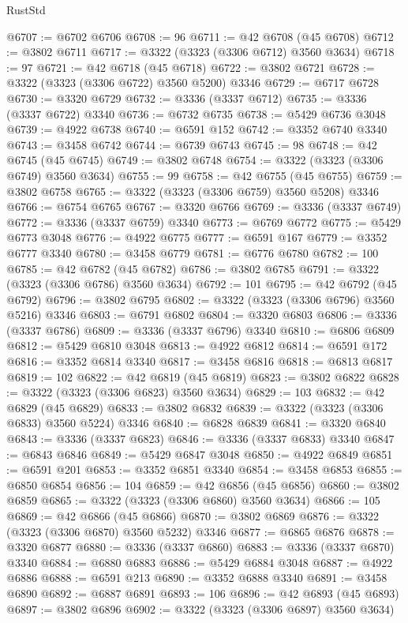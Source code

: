 \begin{lexlean}{RustStd}
\begin{coremodule}
@6707 := @6702 @6706
@6708 := 96
@6711 := @42 @6708 (@45 @6708)
@6712 := @3802 @6711
@6717 := @3322 (@3323 (@3306 @6712) @3560 @3634)
@6718 := 97
@6721 := @42 @6718 (@45 @6718)
@6722 := @3802 @6721
@6728 := @3322 (@3323 (@3306 @6722) @3560 @5200) @3346
@6729 := @6717 @6728
@6730 := @3320 @6729
@6732 := @3336 (@3337 @6712)
@6735 := @3336 (@3337 @6722) @3340
@6736 := @6732 @6735
@6738 := @5429 @6736 @3048
@6739 := @4922 @6738
@6740 := @6591 @152
@6742 := @3352 @6740 @3340
@6743 := @3458 @6742
@6744 := @6739 @6743
@6745 := 98
@6748 := @42 @6745 (@45 @6745)
@6749 := @3802 @6748
@6754 := @3322 (@3323 (@3306 @6749) @3560 @3634)
@6755 := 99
@6758 := @42 @6755 (@45 @6755)
@6759 := @3802 @6758
@6765 := @3322 (@3323 (@3306 @6759) @3560 @5208) @3346
@6766 := @6754 @6765
@6767 := @3320 @6766
@6769 := @3336 (@3337 @6749)
@6772 := @3336 (@3337 @6759) @3340
@6773 := @6769 @6772
@6775 := @5429 @6773 @3048
@6776 := @4922 @6775
@6777 := @6591 @167
@6779 := @3352 @6777 @3340
@6780 := @3458 @6779
@6781 := @6776 @6780
@6782 := 100
@6785 := @42 @6782 (@45 @6782)
@6786 := @3802 @6785
@6791 := @3322 (@3323 (@3306 @6786) @3560 @3634)
@6792 := 101
@6795 := @42 @6792 (@45 @6792)
@6796 := @3802 @6795
@6802 := @3322 (@3323 (@3306 @6796) @3560 @5216) @3346
@6803 := @6791 @6802
@6804 := @3320 @6803
@6806 := @3336 (@3337 @6786)
@6809 := @3336 (@3337 @6796) @3340
@6810 := @6806 @6809
@6812 := @5429 @6810 @3048
@6813 := @4922 @6812
@6814 := @6591 @172
@6816 := @3352 @6814 @3340
@6817 := @3458 @6816
@6818 := @6813 @6817
@6819 := 102
@6822 := @42 @6819 (@45 @6819)
@6823 := @3802 @6822
@6828 := @3322 (@3323 (@3306 @6823) @3560 @3634)
@6829 := 103
@6832 := @42 @6829 (@45 @6829)
@6833 := @3802 @6832
@6839 := @3322 (@3323 (@3306 @6833) @3560 @5224) @3346
@6840 := @6828 @6839
@6841 := @3320 @6840
@6843 := @3336 (@3337 @6823)
@6846 := @3336 (@3337 @6833) @3340
@6847 := @6843 @6846
@6849 := @5429 @6847 @3048
@6850 := @4922 @6849
@6851 := @6591 @201
@6853 := @3352 @6851 @3340
@6854 := @3458 @6853
@6855 := @6850 @6854
@6856 := 104
@6859 := @42 @6856 (@45 @6856)
@6860 := @3802 @6859
@6865 := @3322 (@3323 (@3306 @6860) @3560 @3634)
@6866 := 105
@6869 := @42 @6866 (@45 @6866)
@6870 := @3802 @6869
@6876 := @3322 (@3323 (@3306 @6870) @3560 @5232) @3346
@6877 := @6865 @6876
@6878 := @3320 @6877
@6880 := @3336 (@3337 @6860)
@6883 := @3336 (@3337 @6870) @3340
@6884 := @6880 @6883
@6886 := @5429 @6884 @3048
@6887 := @4922 @6886
@6888 := @6591 @213
@6890 := @3352 @6888 @3340
@6891 := @3458 @6890
@6892 := @6887 @6891
@6893 := 106
@6896 := @42 @6893 (@45 @6893)
@6897 := @3802 @6896
@6902 := @3322 (@3323 (@3306 @6897) @3560 @3634)

\end{coremodule}
\end{lexlean}
